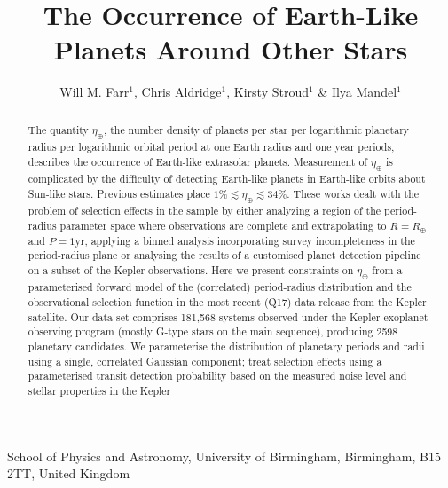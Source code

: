\documentclass{nature}
\newcommand{\etaearth}{\eta_\oplus}
\newcommand{\REarth}{R_\oplus}
\begin{document}
\title{The Occurrence of Earth-Like Planets Around Other Stars}

\author{Will M. Farr$^{1}$, Chris Aldridge$^{1}$, Kirsty Stroud$^{1}$ \& Ilya Mandel$^{1}$}

\maketitle

\begin{affiliations}
\item School of Physics and Astronomy, University of Birmingham, Birmingham, B15 2TT, United Kingdom
\end{affiliations}

\begin{abstract}
  The quantity $\etaearth$, the number density of planets per star per
  logarithmic planetary radius per logarithmic orbital period at one
  Earth radius and one year periods, describes the occurrence of
  Earth-like extrasolar planets.  Measurement of $\etaearth$ is
  complicated by the difficulty of detecting Earth-like planets in
  Earth-like orbits about Sun-like stars.  Previous
  estimates\cite{Catanzarite2011,Traub2012,Dong2013,Petigura2013,Foreman-Mackey2014}
  place $1\% \lesssim \etaearth \lesssim 34\%$.  These works dealt
  with the problem of selection effects in the sample by either
  analyzing a region of the period-radius parameter space where
  observations are complete and extrapolating to $R = \REarth$ and $P
  = 1 \mathrm{yr}$\cite{Catanzarite2011,Traub2012}, applying a binned
  analysis incorporating survey incompleteness in the period-radius
  plane\cite{Dong2013,Petigura2013} or analysing the results of a
  customised planet detection pipeline on a subset of the Kepler
  observations\cite{Petigura2013,Foreman-Mackey2014}.  Here we present
  constraints on $\etaearth$ from a parameterised forward model of the
  (correlated) period-radius distribution and the observational
  selection function in the most recent (Q17) data release from the
  Kepler satellite\cite{Borucki2010,Borucki2011,Batalha2013}.  Our
  data set comprises 181,568 systems observed under the Kepler
  exoplanet observing program (mostly G-type stars on the main
  sequence\cite{Batalha2010}), producing 2598 planetary candidates.
  We parameterise the distribution of planetary periods and radii
  using a single, correlated Gaussian component; treat selection
  effects using a parameterised transit detection probability based on
  the measured noise level and stellar properties in the Kepler

\end{abstract}
\end{document}
